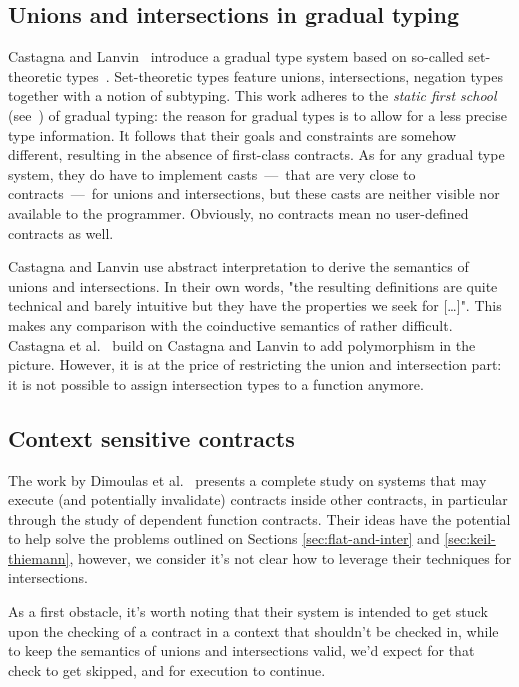 \documentclass[sigplan,screen,10pt]{acmart}
\begin{document}
\subsection{Unions and intersections in gradual typing}

Castagna and Lanvin~\cite{CastagnaLanvinGradualUnionIntersection} introduce a
gradual type system based on so-called set-theoretic
types~\cite{SetTheoreticTypes}.  Set-theoretic types feature unions,
intersections, negation types together with a notion of subtyping. This work
adheres to the \emph{static first school} (see~\cite{practiceTheoryGrad}) of
gradual typing: the reason for gradual types is to allow for a less precise type
information. It follows that their goals and constraints are somehow different,
resulting in the absence of first-class contracts. As for any gradual type
system, they do have to implement casts~---~that are very close to
contracts~---~for unions and intersections, but these casts are neither visible
nor available to the programmer. Obviously, no contracts mean no user-defined
contracts as well.

Castagna and Lanvin use abstract interpretation to derive the semantics of
unions and intersections. In their own words, "the resulting definitions are
quite technical and barely intuitive but they have the properties we seek for
[\ldots]".  This makes any comparison with the coinductive semantics of
\citeauthor{KeilThiemannUnionIntersection} rather difficult. Castagna et
al.~\cite{gradualCastagna} build on Castagna and Lanvin to add polymorphism in
the picture. However, it is at the price of restricting the union and
intersection part: it is not possible to assign intersection types to a function
anymore.

\subsection{Context sensitive contracts}

The work by Dimoulas et al.~\cite{dimoulasESOP,dimoulasPOPL} presents
a complete study on systems that may execute (and potentially invalidate)
contracts inside other contracts, in particular through the study
of dependent function contracts.
Their ideas have the potential to help solve the problems outlined
on Sections \ref{sec:flat-and-inter} and \ref{sec:keil-thiemann},
however, we consider it's not clear how to leverage their techniques
for intersections.

As a first obstacle, it's worth noting that their system is intended
to get stuck upon the checking of a contract in a context that shouldn't
be checked in, while to keep the semantics of unions and intersections
valid, we'd expect for that check to get skipped, and for execution
to continue.
\end{document}
